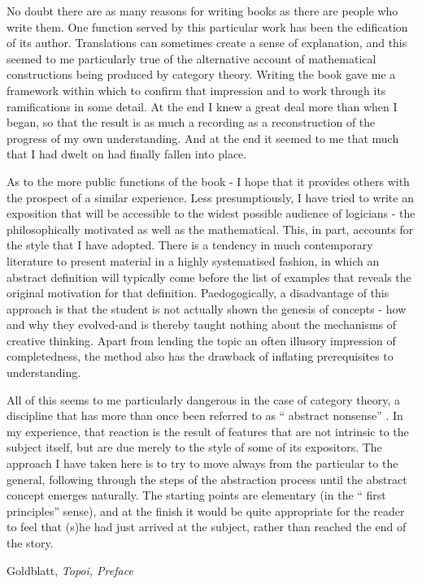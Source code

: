 \documentclass[11pt,openany]{article}
\begin{document}
\pagebreak
\epigraph{No doubt there are as many reasons for writing books as there are people
who write them. One function served by this particular work has been the
edification of its author. Translations can sometimes create a sense of
explanation, and this seemed to me particularly true of the alternative
account of mathematical constructions being produced by category
theory. Writing the book gave me a framework within which to confirm
that impression and to work through its ramifications in some detail. At
the end I knew a great deal more than when I began, so that the result is
as much a recording as a reconstruction of the progress of my own
understanding. And at the end it seemed to me that much that I had
dwelt on had finally fallen into place.
\par
As to the more public functions of the book - I hope that it provides
others with the prospect of a similar experience. Less presumptiously, I
have tried to write an exposition that will be accessible to the widest
possible audience of logicians - the philosophically motivated as well as
the mathematical. This, in part, accounts for the style that I have adopted.
There is a tendency in much contemporary literature to present material
in a highly systematised fashion, in which an abstract definition will
typically come before the list of examples that reveals the original
motivation for that definition. Paedogogically, a disadvantage of this
approach is that the student is not actually shown the genesis of concepts -
how and why they evolved-and is thereby taught nothing about the
mechanisms of creative thinking. Apart from lending the topic an often
illusory impression of completedness, the method also has the drawback
of inflating prerequisites to understanding.
\par
All of this seems to me particularly dangerous in the case of category
theory, a discipline that has more than once been referred to as “ abstract
nonsense” . In my experience, that reaction is the result of features that
are not intrinsic to the subject itself, but are due merely to the style of
some of its expositors. The approach I have taken here is to try to move
always from the particular to the general, following through the steps of
the abstraction process until the abstract concept emerges naturally. The
starting points are elementary (in the “ first principles” sense), and at the
finish it would be quite appropriate for the reader to feel that (s)he had
just arrived at the subject, rather than reached the end of the story.}
{Goldblatt, \textit{Topoi, Preface}~\cite{goldblatt-1984-topoi}}
\setcounter{currentlevel}{\value{baseSectionLevel}}
\label{sec:Preface-2020-07}
\end{document}
